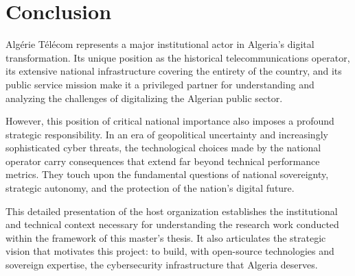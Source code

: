 \section{Conclusion}
\label{sec:ch1-conclusion}

Algérie Télécom represents a major institutional actor in Algeria's digital transformation. Its unique position as the historical telecommunications operator, its extensive national infrastructure covering the entirety of the country, and its public service mission make it a privileged partner for understanding and analyzing the challenges of digitalizing the Algerian public sector.

However, this position of critical national importance also imposes a profound strategic responsibility. In an era of geopolitical uncertainty and increasingly sophisticated cyber threats, the technological choices made by the national operator carry consequences that extend far beyond technical performance metrics. They touch upon the fundamental questions of national sovereignty, strategic autonomy, and the protection of the nation's digital future.

This detailed presentation of the host organization establishes the institutional and technical context necessary for understanding the research work conducted within the framework of this master's thesis. It also articulates the strategic vision that motivates this project: to build, with open-source technologies and sovereign expertise, the cybersecurity infrastructure that Algeria deserves.

